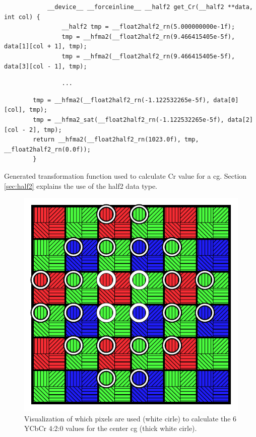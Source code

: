 \begin{listing}[H]
    \begin{verbatim}
            __device__ __forceinline__ __half2 get_Cr(__half2 **data, int col) {
                __half2 tmp = __float2half2_rn(5.000000000e-1f);
                tmp = __hfma2(__float2half2_rn(9.466415405e-5f), data[1][col + 1], tmp);
                tmp = __hfma2(__float2half2_rn(9.466415405e-5f), data[3][col - 1], tmp);
            \end{verbatim}
    \vspace{-28pt}
    \begin{verbatim}
                ...
            \end{verbatim}
    \vspace{-28pt}
    \begin{verbatim}
        tmp = __hfma2(__float2half2_rn(-1.122532265e-5f), data[0][col], tmp);
        tmp = __hfma2_sat(__float2half2_rn(-1.122532265e-5f), data[2][col - 2], tmp);
        return __hfma2(__float2half2_rn(1023.0f), tmp, __float2half2_rn(0.0f));
        }
    \end{verbatim}
    \caption{Generated transformation function used to calculate Cr value for a \gls{cg}.
        Section \ref{sec:half2} explains the use of the \gls{half2} data type.}
    \label{listing:generated_function}
\end{listing}
\begin{figure}[H]
    \centering
    \includegraphics[width=.35\textwidth]{figures/polarized_image/normal_conv.pdf}
    \caption{Visualization of which pixels are used (white cirle) to calculate the 6 YCbCr 4:2:0 values for the center \gls{cg} (thick white cirle).}
    \label{fig:transformation}
\end{figure}